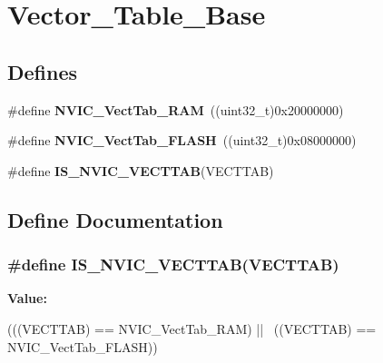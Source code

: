 \hypertarget{group__Vector__Table__Base}{
\section{Vector\_\-Table\_\-Base}
\label{group__Vector__Table__Base}
}
\subsection*{Defines}
\begin{DoxyCompactItemize}
\item 
\hypertarget{group__Vector__Table__Base_ga8be8181cc3e5d42f6204af306ab50f80}{
\#define {\bfseries NVIC\_\-VectTab\_\-RAM}~((uint32\_\-t)0x20000000)}
\label{group__Vector__Table__Base_ga8be8181cc3e5d42f6204af306ab50f80}

\item 
\hypertarget{group__Vector__Table__Base_gafbf92fd28a1090b2aa49732ebd5704b5}{
\#define {\bfseries NVIC\_\-VectTab\_\-FLASH}~((uint32\_\-t)0x08000000)}
\label{group__Vector__Table__Base_gafbf92fd28a1090b2aa49732ebd5704b5}

\item 
\#define {\bfseries IS\_\-NVIC\_\-VECTTAB}(VECTTAB)
\end{DoxyCompactItemize}


\subsection{Define Documentation}
\hypertarget{group__Vector__Table__Base_ga26b9d493ccb98fcce9a27303078940c8}{
\subsubsection[{IS\_\-NVIC\_\-VECTTAB}]{\setlength{\rightskip}{0pt plus 5cm}\#define IS\_\-NVIC\_\-VECTTAB(VECTTAB)}}
\label{group__Vector__Table__Base_ga26b9d493ccb98fcce9a27303078940c8}
{\bfseries Value:}
\begin{DoxyCode}
(((VECTTAB) == NVIC_VectTab_RAM) || \
                                  ((VECTTAB) == NVIC_VectTab_FLASH))
\end{DoxyCode}
